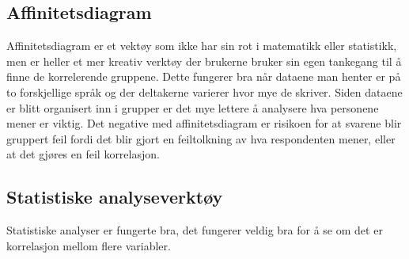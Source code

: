 \subsection{Affinitetsdiagram}
Affinitetsdiagram er et vektøy som ikke har sin rot i matematikk eller statistikk, men er heller et mer kreativ verktøy der brukerne bruker sin egen tankegang til å finne de korrelerende gruppene. Dette fungerer bra når dataene man henter er på to forskjellige språk og der deltakerne varierer hvor mye de skriver. Siden dataene er blitt organisert inn i grupper er det mye lettere å analysere hva personene mener er viktig. Det negative med affinitetsdiagram er risikoen for at svarene blir gruppert feil fordi det blir gjort en feiltolkning av hva respondenten mener, eller at det gjøres en feil korrelasjon.    

\subsection{Statistiske analyseverktøy}
Statistiske analyser er fungerte bra, det fungerer veldig bra for å se om det er korrelasjon mellom flere variabler. 


